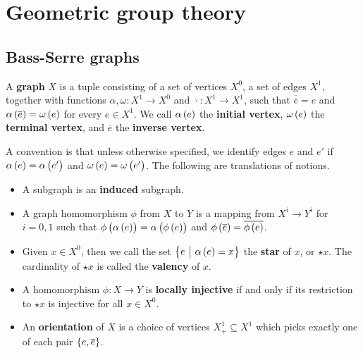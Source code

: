 \section{Geometric group theory}

\subsection{Bass-Serre graphs}

\begin{definition}
A \textbf{graph} $ X $ is a tuple consisting of a set of vertices $ X^0 $, a set of edges $ X^1 $, together with functions $ \alpha, \omega : X^1 \to X^0 $ and $ \overline{\cdot} : X^1 \to X^1 $, such that $ \overline{\overline{e}} = e $ and $ \alpha\br{\overline{e}} = \omega\br{e} $ for every $ e \in X^1 $. We call $ \alpha\br{e} $ the \textbf{initial vertex}, $ \omega\br{e} $ the \textbf{terminal vertex}, and $ \overline{e} $ the \textbf{inverse vertex}.
\end{definition}

A convention is that unless otherwise specified, we identify edges $ e $ and $ e' $ if $ \alpha\br{e} = \alpha\br{e'} $ and $ \omega\br{e} = \omega\br{e'} $. The following are translations of notions.
\begin{itemize}
\item A subgraph is an \textbf{induced} subgraph.
\item A graph homomorphism $ \phi $ from $ X $ to $ Y $ is a mapping from $ X^i \to Y^i $ for $ i = 0, 1 $ such that $ \phi\br{\alpha\br{e}} = \alpha\br{\phi\br{e}} $ and $ \phi\br{\overline{e}} = \overline{\phi\br{e}} $.
\item Given $ x \in X^0 $, then we call the set $ \cbr{e \st \alpha\br{e} = x} $ the \textbf{star} of $ x $, or $ \star x $. The cardinality of $ \star x $ is called the \textbf{valency} of $ x $.
\item A homomorphism $ \phi : X \to Y $ is \textbf{locally injective} if and only if its restriction to $ \star x $ is injective for all $ x \in X^0 $.
\item An \textbf{orientation} of $ X $ is a choice of vertices $ X_+^1 \subseteq X^1 $ which picks exactly one of each pair $ \cbr{e, \overline{e}} $.
\end{itemize}

